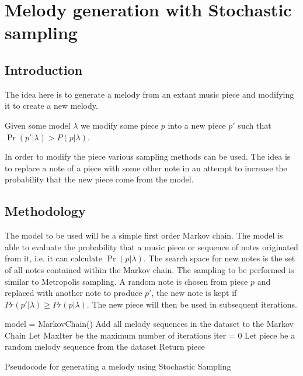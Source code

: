 \chapter{Melody generation with Stochastic sampling}
\section{Introduction}
The idea here is to generate a melody from an extant music piece and modifying it to create a new melody. 

Given some model $\lambda$ we modify some piece $p$ into a new piece $p'$ such that $\Pr(p'|\lambda) > P(p|\lambda)$.


In order to modify the piece various sampling methods can be used. The idea is to replace a note of a piece with some other note in an attempt to increase the probability that the new piece come from the model. 

\section{Methodology}
The model to be used will be a simple first order Markov chain. The model is able to evaluate the probability that a music piece or sequence of notes originated from it, i.e. it can calculate $\Pr(p|\lambda)$. The search space for new notes is the set of all notes contained within the Markov chain.
The sampling to be performed is similar to Metropolis sampling. A random note is chosen from piece $p$ and replaced with another note to produce $p'$, the new note is kept if $Pr(p'|\lambda) \geq Pr(p|\lambda)$. The new piece will then be used in subsequent iterations.

\begin{algorithm}
 model = MarkovChain()\;
 Add all melody sequences in the dataset to the Markov Chain\;
 Let MaxIter be the maximum number of iterations\;
 iter = 0\;
 Let piece be a random melody sequence from the dataset\;
 Return piece\;
 \caption{Pseudocode for generating a melody using Stochastic Sampling}
\end{algorithm}

